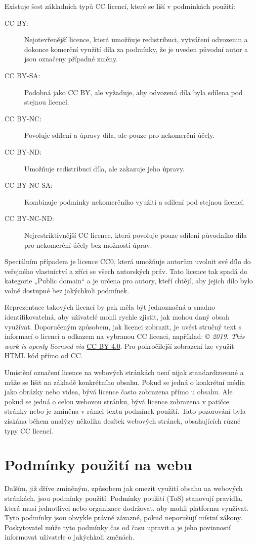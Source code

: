 Existuje šest základních typů CC licencí, které se liší v podmínkách použití:
\begin{description}
    \item[CC BY:] Nejotevřenější licence, která umožňuje redistribuci, vytváření odvozenin a dokonce komerční využití díla za podmínky, že je uveden původní autor a jsou označeny případné změny.
    \item[CC BY-SA:] Podobná jako CC BY, ale vyžaduje, aby odvozená díla byla sdílena pod stejnou licencí.
    \item[CC BY-NC:] Povoluje sdílení a úpravy díla, ale pouze pro nekomerční účely.
    \item[CC BY-ND:] Umožňuje redistribuci díla, ale zakazuje jeho úpravy.
    \item[CC BY-NC-SA:] Kombinuje podmínky nekomerčního využití a sdílení pod stejnou licencí.
    \item[CC BY-NC-ND:] Nejrestriktivnější CC licence, která povoluje pouze sdílení původního díla pro nekomerční účely bez možnosti úprav. \cite{creativecommonsAboutLicenses}
\end{description}
Speciálním případem je licence CC0, která umožňuje autorům uvolnit své dílo do veřejného vlastnictví a zříci se všech autorských práv.
Tato licence tak spadá do kategorie „Public domain“ a je určena pro autory, kteří chtějí, aby jejich dílo bylo volně dostupné bez jakýchkoli podmínek.

Reprezentace takových licencí by pak měla být jednoznačná a snadno identifikovatelná, aby uživatelé mohli rychle zjistit, jak mohou daný obsah využívat.
Doporučeným způsobem, jak licenci zobrazit, je uvést stručný text s informací o licenci a odkazem na vybranou CC licenci, například: \textit{© 2019. This work is openly licensed via} \href{https://creativecommons.org/licenses/by/4.0/}{CC BY 4.0}.
Pro pokročilejší zobrazení lze využít HTML kód přímo od CC. \cite{creativecommonsAboutLicenses}

Umístění označení licence na webových stránkách není nijak standardizované a může se lišit na základě konkrétního obsahu.
Pokud se jedná o konkrétní média jako obrázky nebo videa, bývá licence často zobrazena přímo u obsahu.
Ale pokud se jedná o celou webovou stránku, bývá licence zobrazena v patičce stránky nebo je zmíněna v rámci textu podmínek použití.
Tato pozorování byla získána během analýzy několika desítek webových stránek, obsahujících různé typy CC licencí.

\section{Podmínky použití na webu}
Dalším, již dříve zmíněným, způsobem jak omezit využití obsahu na webových stránkách, jsou podmínky použití.
Podmínky použití (ToS) stanovují pravidla, která musí jednotlivci nebo organizace dodržovat, aby mohli platformu využívat.
Tyto podmínky jsou obvykle právně závazné, pokud neporušují místní zákony.
Poskytovatel může tyto podmínky čas od času upravit a je jeho povinností informovat uživatele o jakýchkoli změnách. \cite{pcmagDefinitionTerms}

